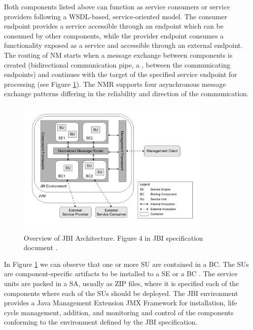 Both components listed above can function as service consumers or service providers following a \ac{WSDL}-based, service-oriented model. The consumer endpoint provides a service accessible through an endpoint which can be consumed by other components, while the provider endpoint consumes a functionality exposed as a service and accessible through an external endpoint. The routing of \ac{NM} starts when a message exchange between components is created (bidirectional communication pipe, a , between the communicating endpoints) and continues with the target of the specified service endpoint for processing (see Figure \ref{fig:jbi}). The \ac{NMR} supports four asynchronous message exchange patterns differing in the reliability and direction of the communication.

\begin{figure}[htb]
	\centering
		\includegraphics[width=0.85\textwidth, trim=0.95cm 0.95cm 0.95cm 0.95cm, clip]{./gfx/JBIArchitecture.pdf}
	\caption[JBI Architecture]{Overview of JBI Architecture. Figure 4 in JBI specification document \cite{JBI2005}.}
	\label{fig:jbi}
\end{figure}

In Figure \ref{fig:jbi} we can observe that one or more \ac{SU} are contained in a \ac{BC}. The \ac{SU}s are component-specific artifacts to be installed to a \ac{SE} or a \ac{BC} \cite{JBI2005}. The service units are packed in a \ac{SA}, usually as ZIP files, where it is specified each of the components where each of the \ac{SU}s should be deployed. The \ac{JBI} environment provides a Java Management Extension \ac{JMX} Framework for installation, life cycle management, addition, and monitoring and control of the components conforming to the environment defined by the JBI specification.

\FloatBarrier